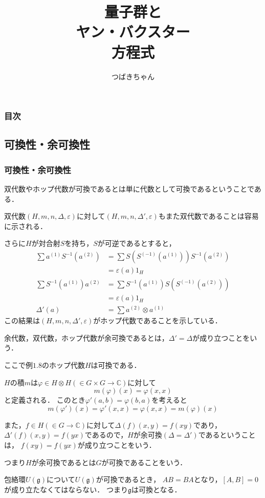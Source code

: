\documentclass[dvipdfm]{beamer}
\title{量子群と\\ヤン・バクスター\\方程式}
\author{つばきちゃん}
\newcommand{\CC}{\mathbb{C}}
\begin{document}
  \begin{frame}
    \titlepage
  \end{frame}
  \begin{frame}
    \frametitle{目次}
    \tableofcontents
  \end{frame}
  \subsection{可換性・余可換性}
  \begin{frame}
    \frametitle{可換性・余可換性}
    双代数やホップ代数が可換であるとは単に代数として可換であるということである．

    双代数$(H,m,n,\Delta,\varepsilon)$に対して$(H,m,n,\Delta',\varepsilon)$もまた双代数であることは容易に示される．

    さらに$H$が対合射$S$を持ち，$S$が可逆であるとすると，
    \begin{align*}
      \sum a^{(1)}S^{-1}(a^{(2)}) &= \sum S(S^{(-1)}(a^{(1)}))S^{-1}(a^{(2)}) \\
      &= \varepsilon(a)1_H\\
      \sum S^{-1}(a^{(1)})a^{(2)} &= \sum S^{-1}(a^{(1)})S(S^{(-1)}(a^{(2)})) \\
      &= \varepsilon(a)1_H\\
      \Delta'(a) &= \sum a^{(2)}\otimes a^{(1)}
    \end{align*}
    この結果は$(H,m,n,\Delta',\varepsilon)$がホップ代数であることを示している．
  \end{frame}
  \begin{frame}
    \begin{definition}
      余代数，双代数，ホップ代数が余可換であるとは，$\Delta' = \Delta$が成り立つことをいう．
    \end{definition}
    ここで例$1.8$のホップ代数$H$は可換である．
    
    $H$の積$m$は$\varphi\in H\otimes H(\in G\times G \to \CC)$に対して
    \[
    m(\varphi)(x) = \varphi(x,x)
    \]
    と定義される．
    このとき$\varphi'(a,b)=\varphi(b,a)$を考えると
    \[
    m(\varphi')(x) = \varphi'(x,x) = \varphi(x,x) = m(\varphi)(x)
    \]
  \end{frame}
  \begin{frame}
    また，$f \in H (\in G \to \CC)$に対して$\Delta(f)(x,y) = f(xy)$であり，
    $\Delta'(f)(x,y) = f(yx)$であるので，$H$が余可換$(\Delta=\Delta')$であるということは，
    $f(xy) = f(yx)$が成り立つことをいう．

    つまり$H$が余可換であるとは$G$が可換であることをいう．

    包絡環$U(\mathfrak{g})$について$U(\mathfrak{g})$が可換であるとき，
    $AB=BA$となり，$[A,B]=0$が成り立たなくてはならない．
    つまり$\mathfrak{g}$は可換となる．
  \end{frame}
\end{document}
